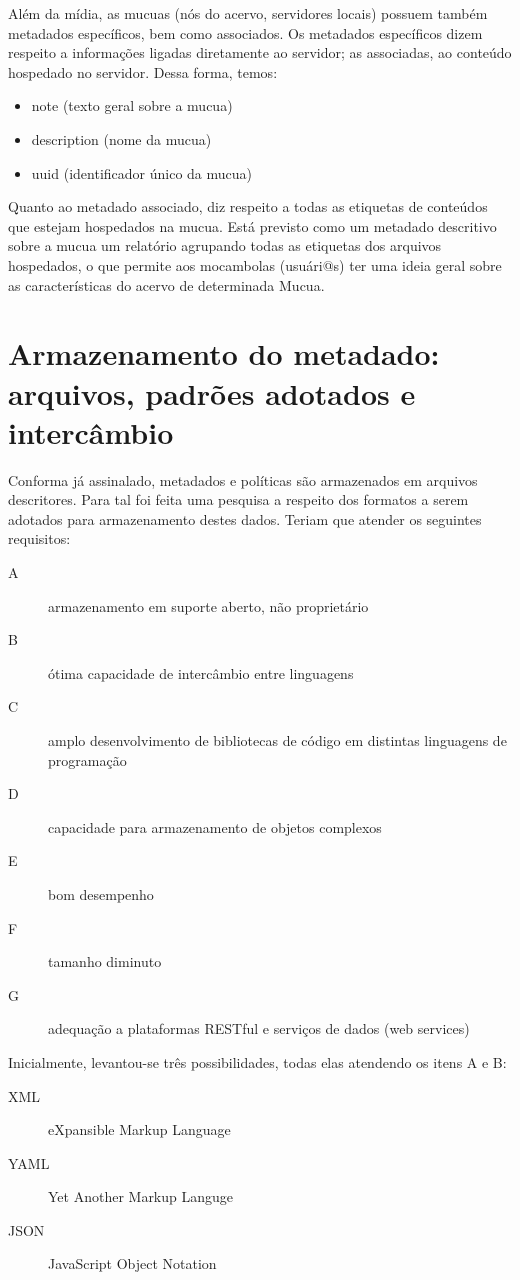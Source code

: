 Além da mídia, as mucuas (nós do acervo, servidores locais) possuem
também metadados específicos, bem como associados. Os metadados
específicos dizem respeito a informações ligadas diretamente ao
servidor; as associadas, ao conteúdo hospedado no servidor. Dessa
forma, temos:
\begin{itemize}
\item note (texto geral sobre a mucua)
\item description (nome da mucua)
\item uuid (identificador único da mucua)
\end{itemize}


Quanto ao metadado associado, diz respeito a todas as etiquetas de
conteúdos que estejam hospedados na mucua. Está previsto como um
metadado descritivo sobre a mucua um relatório agrupando todas as
etiquetas dos arquivos hospedados, o que permite aos mocambolas
(usuári@s) ter uma ideia geral sobre as características do acervo de
determinada Mucua.

\section{Armazenamento do metadado: arquivos, padrões adotados e intercâmbio}

Conforma já assinalado, metadados e políticas são armazenados em
arquivos descritores. Para tal foi feita uma pesquisa a respeito dos
formatos a serem adotados para armazenamento destes dados. Teriam que
atender os seguintes requisitos:
\begin{description}
\item[A] armazenamento em suporte aberto, não proprietário
\item[B] ótima capacidade de intercâmbio entre linguagens
\item[C] amplo desenvolvimento de bibliotecas de código em distintas linguagens de programação
\item[D] capacidade para armazenamento de objetos complexos
\item[E] bom desempenho
\item[F] tamanho diminuto
\item[G] adequação a plataformas RESTful e serviços de dados (web services)
\end{description}

Inicialmente, levantou-se três possibilidades, todas elas atendendo os itens A e B:
\begin{description}
\item[XML] eXpansible Markup Language
\item[YAML] Yet Another Markup Languge
\item[JSON] JavaScript Object Notation
\end{description}

